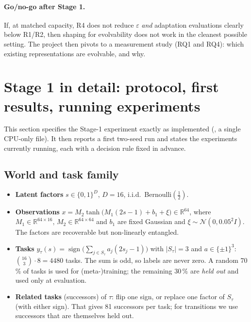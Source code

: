 \documentclass[11pt,a4paper]{article}
\theoremstyle{definition}
\theoremstyle{plain}
\theoremstyle{remark}
\newcommand{\R}{\mathbb{R}}
\newcommand{\sign}{\operatorname{sign}}
\begin{document}
\paragraph{Go/no-go after Stage 1.} If, at matched capacity, R4 does not reduce $\varepsilon$ \emph{and} adaptation evaluations clearly below R1/R2, then shaping for evolvability does not work in the cleanest possible setting. The project then pivots to a measurement study (RQ1 and RQ4): which existing representations are evolvable, and why.

\section{Stage 1 in detail: protocol, first results, running experiments}
\label{sec:stage1}

This section specifies the Stage-1 experiment exactly as implemented (, a single CPU-only file). It then reports a first two-seed run and states the experiments currently running, each with a decision rule fixed in advance.

\subsection{World and task family}
\begin{itemize}
\item \textbf{Latent factors} $s\in\{0,1\}^{D}$, $D=16$, i.i.d.\ Bernoulli$(\tfrac12)$.
\item \textbf{Observations} $x = M_2\tanh\big(M_1(2s-1)+b_1+\xi\big)\in\R^{64}$, where $M_1\in\R^{64\times16}$, $M_2\in\R^{64\times64}$ and $b_1$ are fixed Gaussian and $\xi\sim\mathcal{N}(0,0.05^2I)$. The factors are recoverable but non-linearly entangled.
\item \textbf{Tasks} $y_\tau(s)=\sign\big(\sum_{j\in S_\tau}a_j(2s_j-1)\big)$ with $|S_\tau|=3$ and $a\in\{\pm1\}^3$: $\binom{16}{3}\cdot 8 = 4480$ tasks. The sum is odd, so labels are never zero. A random 70\,\% of tasks is used for (meta-)training; the remaining 30\,\% are \emph{held out} and used only at evaluation.
\item \textbf{Related tasks} (successors) of $\tau$: flip one sign, or replace one factor of $S_\tau$ (with either sign). That gives 81 successors per task; for transitions we use successors that are themselves held out.
\end{itemize}
\end{document}

